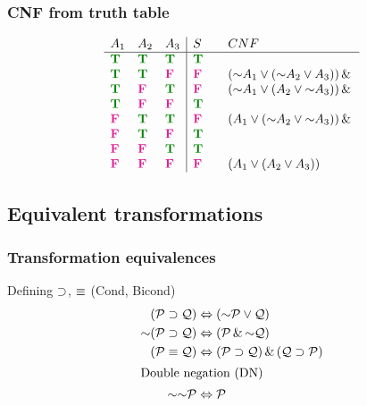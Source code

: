\begin{frame}
  \frametitle{CNF from truth table}
\[
\begin{array}{lll|l@{\qquad}l}
A_1 & A_2 & A_3 & S & CNF\\
\hline
\True & \True & \True & \True & \\
\True & \True & \False & \False & (\lnot A_1 \lor (\lnot A_2 \lor A_3)) \land {}\\
\True & \False & \True & \False & (\lnot A_1 \lor (A_2 \lor \lnot A_3)) \land {}\\
\True & \False & \False & \True \\
\False & \True & \True & \False & (A_1 \lor (\lnot A_2 \lor \lnot A_3)) \land {}\\
\False & \True & \False & \True & \\
\False & \False & \True & \True & \\
\False & \False & \False & \False & (A_1 \lor (A_2 \lor A_3))
\end{array}\]
\end{frame}

\subsection{Equivalent transformations}

\begin{frame}
\frametitle{Transformation equivalences}

Defining $\supset$, $\equiv$ (Cond, Bicond)
\begin{align*}
(\metav{P} \eif \metav{Q}) & \Leftrightarrow (\lnot\metav{P} \lor \metav{Q})\\
\lnot(\metav{P} \eif \metav{Q}) & \Leftrightarrow (\metav{P} \land \lnot\metav{Q})\\
(\metav{P} \eiff \metav{Q}) & \Leftrightarrow (\metav{P} \eif \metav{Q}) \land (\metav{Q} \eif \metav{P})\\
\intertext{Double negation (DN)}
\lnot\lnot\metav{P} & \Leftrightarrow \metav{P}
\end{align*}

\end{frame}

